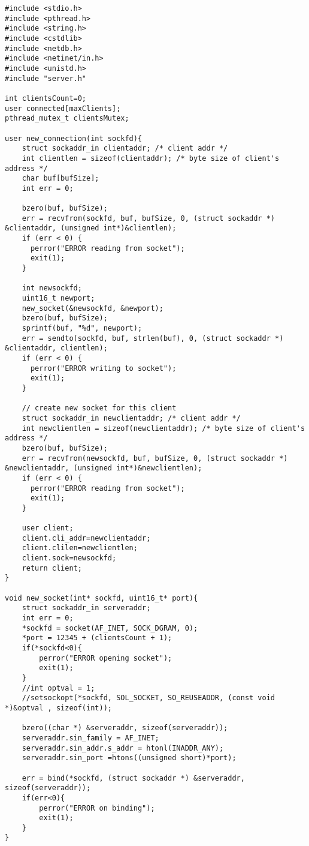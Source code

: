 \documentclass[12pt,a4paper]{report}
\begin{document}
\begin{lstlisting}
#include <stdio.h>
#include <pthread.h>
#include <string.h>
#include <cstdlib>
#include <netdb.h>
#include <netinet/in.h>
#include <unistd.h>
#include "server.h"

int clientsCount=0;
user connected[maxClients];
pthread_mutex_t clientsMutex;

user new_connection(int sockfd){
    struct sockaddr_in clientaddr; /* client addr */
    int clientlen = sizeof(clientaddr); /* byte size of client's address */
    char buf[bufSize];
    int err = 0;

    bzero(buf, bufSize);
    err = recvfrom(sockfd, buf, bufSize, 0, (struct sockaddr *) &clientaddr, (unsigned int*)&clientlen);
    if (err < 0) {
      perror("ERROR reading from socket");
      exit(1);
    }

    int newsockfd;
    uint16_t newport;
    new_socket(&newsockfd, &newport);
    bzero(buf, bufSize);
    sprintf(buf, "%d", newport);
    err = sendto(sockfd, buf, strlen(buf), 0, (struct sockaddr *) &clientaddr, clientlen);
    if (err < 0) {
      perror("ERROR writing to socket");
      exit(1);
    }

    // create new socket for this client
    struct sockaddr_in newclientaddr; /* client addr */
    int newclientlen = sizeof(newclientaddr); /* byte size of client's address */
    bzero(buf, bufSize);
    err = recvfrom(newsockfd, buf, bufSize, 0, (struct sockaddr *) &newclientaddr, (unsigned int*)&newclientlen);
    if (err < 0) {
      perror("ERROR reading from socket");
      exit(1);
    }

    user client;
    client.cli_addr=newclientaddr;
    client.clilen=newclientlen;
    client.sock=newsockfd;
    return client;
}

void new_socket(int* sockfd, uint16_t* port){
    struct sockaddr_in serveraddr;
    int err = 0;
    *sockfd = socket(AF_INET, SOCK_DGRAM, 0);
    *port = 12345 + (clientsCount + 1);
    if(*sockfd<0){
        perror("ERROR opening socket");
        exit(1);
    }
    //int optval = 1;
    //setsockopt(*sockfd, SOL_SOCKET, SO_REUSEADDR, (const void *)&optval , sizeof(int));

    bzero((char *) &serveraddr, sizeof(serveraddr));
    serveraddr.sin_family = AF_INET;
    serveraddr.sin_addr.s_addr = htonl(INADDR_ANY);
    serveraddr.sin_port =htons((unsigned short)*port);

    err = bind(*sockfd, (struct sockaddr *) &serveraddr, sizeof(serveraddr));
    if(err<0){
        perror("ERROR on binding");
        exit(1);
    }
}


\end{lstlisting}
\end{document}
